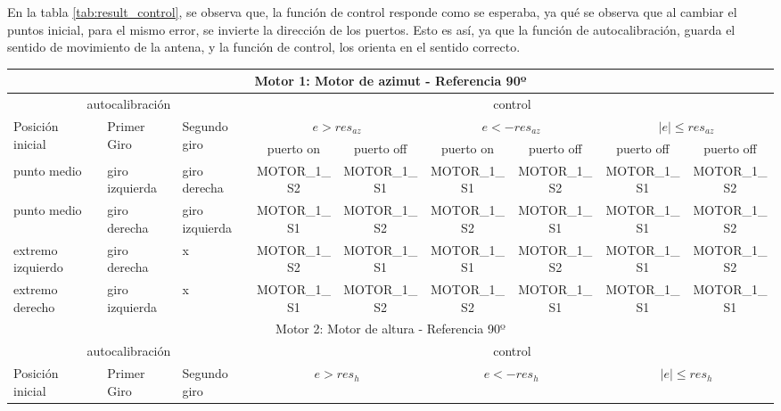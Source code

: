 En la tabla \ref{tab:result_control}, se observa que, la función de control responde como se esperaba, ya qué se observa que al cambiar el puntos inicial, para el mismo error, se invierte la dirección de los puertos. Esto es así, ya que la función de autocalibración, guarda el sentido de movimiento de la antena, y la función de control, los orienta en el sentido correcto.    


\begin{table}[ht]
\resizebox{\linewidth}{!}
{
  \begin{threeparttable}		
	\begin{tabular}{|p{1.5cm}|p{1.5cm}|p{1.5cm}|c|c|c|c|c|c|}
		\hline 
		\multicolumn{9}{|c|}{Motor 1: Motor de azimut - Referencia 90º } \\
		\hline 
		\multicolumn{3}{|c|}{autocalibración} & \multicolumn{6}{c|}{control } \\
		\hline 
		\multirow{2}{1.4cm}{Posición inicial} &\multirow{2}{1.4cm}{ Primer Giro} & \multirow{2}{1.4cm}{Segundo giro} &\multicolumn{2}{c|}{$e>res_{az}$} &\multicolumn{2}{c|}{$e<-res_{az}$} &\multicolumn{2}{c|}{$|e|\leq res_{az}$} \\ \cline{4-9}
		
		 & &  & puerto on & puerto off &puerto on & puerto off&puerto off & puerto off\\ 
		\hline 
		punto medio & giro izquierda & giro derecha & MOTOR\_1\_S2 & MOTOR\_1\_S1  & MOTOR\_1\_S1& MOTOR\_1\_S2& MOTOR\_1\_S1 & MOTOR\_1\_S2 \\ 
		\hline 
		punto medio & giro derecha & giro izquierda &MOTOR\_1\_S1  &MOTOR\_1\_S2
		& MOTOR\_1\_S2&  MOTOR\_1\_S1 &MOTOR\_1\_S1 & MOTOR\_1\_S2 	\\
		\hline 
		extremo izquierdo & giro derecha & x &MOTOR\_1\_S2  & MOTOR\_1\_S1  & MOTOR\_1\_S1& MOTOR\_1\_S2 &MOTOR\_1\_S1 & MOTOR\_1\_S2 \\ 
		\hline 
		extremo derecho & giro izquierda & x & MOTOR\_1\_S1&MOTOR\_1\_S2  & MOTOR\_1\_S2 &MOTOR\_1\_S1 &MOTOR\_1\_S1 &MOTOR\_1\_S1  \\ 
		\hline 
		\hline 
		\multicolumn{9}{|c|}{Motor 2: Motor de altura - Referencia 90º } \\
		\hline 
		\multicolumn{3}{|c|}{autocalibración} & \multicolumn{6}{c|}{control } \\
		\hline 
		\multirow{2}{1.4cm}{Posición inicial} &\multirow{2}{1.4cm}{ Primer Giro} & \multirow{2}{1.4cm}{Segundo giro} &\multicolumn{2}{c|}{$e>res_h$} & \multicolumn{2}{c|}{$e<-res_h$\tnote{1}}  &\multicolumn{2}{c|}{$|e|\leq res_h$} \\ \cline{4-9}
		

\end{tabular}
\end{threeparttable}}
\end{table}

